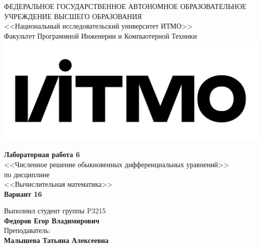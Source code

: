 \begin{titlepage}
	\thispagestyle{firststyle}
	\begin{center}
		ФЕДЕРАЛЬНОЕ ГОСУДАРСТВЕННОЕ АВТОНОМНОЕ ОБРАЗОВАТЕЛЬНОЕ УЧРЕЖДЕНИЕ ВЫСШЕГО ОБРАЗОВАНИЯ\\
		\vspace{0.5cm}
		<<Национальный исследовательский университет ИТМО>>\\
		Факультет Программной Инженерии и Компьютерной Техники \\
		\vspace{1cm}
		\includegraphics[scale=0.1]{img/itmo_logo.png}
	\end{center}

	\vspace{1cm}

	\begin{center}
		\large
    \textbf{Лабораторная работа \textnumero{} 6}\\
		<<Численное решение обыкновенных дифференциальных уравнений>> \\
		по дисциплине\\
		<<Вычислительная математика>> \\
    \textbf{Вариант \textnumero{} 16}
	\end{center}

	\vspace{2cm}

	\begin{flushright}
		Выполнил студент группы P3215\\
		\textbf{Федоров Егор Владимирович} \\
		Преподаватель: \\
		\textbf{Малышева Татьяна Алексеевна}\\
	\end{flushright}

\end{titlepage}
